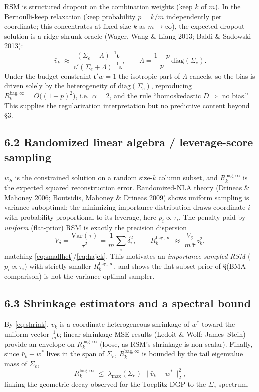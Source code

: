 \documentclass[11pt]{article}
\newcommand{\Sig}{\Sigma_e}
\newcommand{\Rk}{R_k^{\mathrm{bag},\infty}}
\newcommand{\iotab}{\bm{\iota}}
\begin{document}
RSM is structured dropout on the combination weights (keep $k$ of $m$). In the
Bernoulli-keep relaxation (keep probability $p=k/m$ independently per coordinate; this
concentrates at fixed size $k$ as $m\to\infty$), the expected dropout solution is a
ridge-shrunk oracle (Wager, Wang \& Liang 2013; Baldi \& Sadowski 2013):
\begin{equation}\label{eq:dropout}
  \bar v_k\;\approx\;\frac{(\Sig+\Lambda)^{-1}\iotab}{\iotab'(\Sig+\Lambda)^{-1}\iotab},
  \qquad \Lambda=\frac{1-p}{p}\,\mathrm{diag}(\Sig).
\end{equation}
Under the budget constraint $\iotab'w=1$ the isotropic part of $\Lambda$ cancels, so the
bias is driven solely by the heterogeneity of $\mathrm{diag}(\Sig)$, reproducing
$\Rk=O\!\big((1-p)^2\big)$, i.e.\ $\alpha=2$, and the rule ``homoskedastic $D\Rightarrow$ no
bias.'' This supplies the regularization interpretation but no predictive content beyond
\S3.

\subsection*{6.2 Randomized linear algebra / leverage-score sampling}

$w_S$ is the constrained solution on a random size-$k$ column subset, and $\Rk$ is the
expected squared reconstruction error. Randomized-NLA theory (Drineas \& Mahoney 2006;
Boutsidis, Mahoney \& Drineas 2009) shows uniform sampling is variance-suboptimal: the
minimizing importance distribution draws coordinate $i$ with probability proportional to
its leverage, here $p_i\propto\tau_i$. The penalty paid by \emph{uniform} (flat-prior) RSM
is exactly the precision dispersion
\begin{equation}\label{eq:leverage}
  V_\delta=\frac{\mathrm{Var}(\tau)}{\bar\tau^2}=\frac1m\sum_i\delta_i^2,
  \qquad \Rk\;\approx\;\frac{V_\delta}{m\,\bar\tau}\,z_k^2,
\end{equation}
matching \eqref{eq:smallhet}/\eqref{eq:hajek}. This motivates an
\emph{importance-sampled RSM} ($p_i\propto\tau_i$) with strictly smaller $\Rk$, and shows
the flat subset prior of \S(BMA comparison) is not the variance-optimal sampler.

\subsection*{6.3 Shrinkage estimators and a spectral bound}

By \eqref{eq:shrink}, $\bar v_k$ is a coordinate-heterogeneous shrinkage of $w^*$ toward
the uniform vector $\tfrac1m\iotab$; linear-shrinkage MSE results (Ledoit \& Wolf;
James--Stein) provide an envelope on $\Rk$ (loose, as RSM's shrinkage is non-scalar).
Finally, since $\bar v_k-w^*$ lives in the span of $\Sig$, $\Rk$ is bounded by the tail
eigenvalue mass of $\Sig$,
\begin{equation}\label{eq:spectral}
  \Rk\;\le\;\lambda_{\max}(\Sig)\,\|\bar v_k-w^*\|_2^2,
\end{equation}
linking the geometric decay observed for the Toeplitz DGP to the $\Sig$ spectrum.
\end{document}
